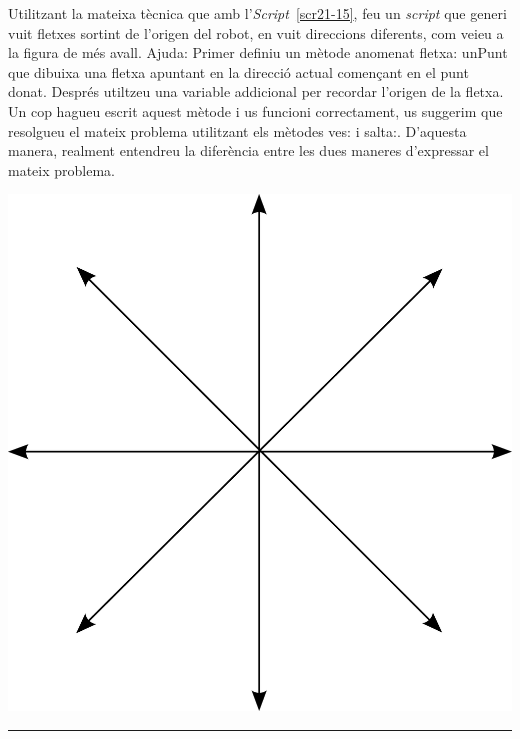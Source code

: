 \begin{center}
\colorbox{black}{}
\end{center}
{\small
\noindent
Utilitzant la mateixa tècnica que amb l'\emph{Script}~\ref{scr21-15}, feu un \emph{script} que generi vuit fletxes sortint de l'origen del robot, en vuit direccions diferents, com veieu a la figura de més avall. Ajuda: Primer definiu un mètode anomenat \textsf{fletxa: unPunt} que dibuixa una fletxa apuntant en la direcció actual començant en el punt donat. Després utiltzeu una variable addicional per recordar l'origen de la fletxa. Un cop hagueu escrit aquest mètode i us funcioni correctament, us suggerim que resolgueu el mateix problema utilitzant els mètodes \textsf{ves:} i \textsf{salta:}. D'aquesta manera, realment entendreu la diferència entre les dues maneres d'expressar el mateix problema.}
\begin{center}
\includegraphics[scale=0.15]{Imatges/figuraE21-5} 
\end{center}
\noindent
\rule{\textwidth}{3pt}

